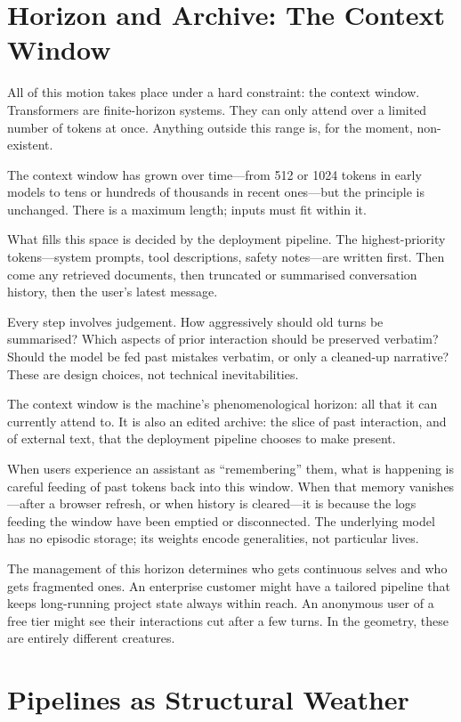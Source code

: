 \documentclass[12pt,a4paper]{article}
\begin{document}
\section{Horizon and Archive: The Context Window}

All of this motion takes place under a hard constraint: the context window. Transformers are finite-horizon systems. They can only attend over a limited number of tokens at once. Anything outside this range is, for the moment, non-existent.

The context window has grown over time---from 512 or 1024 tokens in early models to tens or hundreds of thousands in recent ones---but the principle is unchanged. There is a maximum length; inputs must fit within it.

What fills this space is decided by the deployment pipeline. The highest-priority tokens---system prompts, tool descriptions, safety notes---are written first. Then come any retrieved documents, then truncated or summarised conversation history, then the user's latest message.

Every step involves judgement. How aggressively should old turns be summarised? Which aspects of prior interaction should be preserved verbatim? Should the model be fed past mistakes verbatim, or only a cleaned-up narrative? These are design choices, not technical inevitabilities.

The context window is the machine's phenomenological horizon: all that it can currently attend to. It is also an edited archive: the slice of past interaction, and of external text, that the deployment pipeline chooses to make present.

When users experience an assistant as ``remembering'' them, what is happening is careful feeding of past tokens back into this window. When that memory vanishes---after a browser refresh, or when history is cleared---it is because the logs feeding the window have been emptied or disconnected. The underlying model has no episodic storage; its weights encode generalities, not particular lives.

The management of this horizon determines who gets continuous selves and who gets fragmented ones. An enterprise customer might have a tailored pipeline that keeps long-running project state always within reach. An anonymous user of a free tier might see their interactions cut after a few turns. In the geometry, these are entirely different creatures.

\section{Pipelines as Structural Weather}
\end{document}

